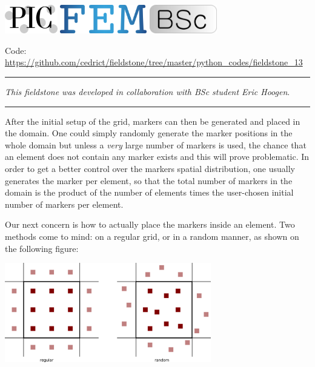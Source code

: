 \includegraphics[height=1.25cm]{images/pictograms/pic}
\includegraphics[height=1.25cm]{images/pictograms/FEM}
\includegraphics[height=1.25cm]{images/pictograms/bsc}



\begin{center}
\inpython 
Code: \url{https://github.com/cedrict/fieldstone/tree/master/python_codes/fieldstone_13}
\end{center}

\par\noindent\rule{\textwidth}{0.4pt}

{\sl This fieldstone was developed in collaboration with BSc student Eric Hoogen}. 

\par\noindent\rule{\textwidth}{0.4pt}



After the initial setup of the grid, markers can then be 
generated and placed in the domain. One could simply randomly generate 
the marker positions in the whole domain but unless a {\it very} large 
number of markers is used, the chance that an element does 
not contain any marker exists and this will prove problematic. 
In order to get a better control over the markers spatial distribution, 
one usually generates the marker per element, so that the total 
number of markers in the domain is the product of the number of 
elements times the user-chosen initial number of markers per element. 

Our next concern is how to actually place the markers inside an element. 
Two methods come to mind: on a regular grid, or in a random manner, 
as shown on the following figure:

\begin{center}
\includegraphics[width=9cm]{python_codes/fieldstone_13/images/markers} 
\end{center}

